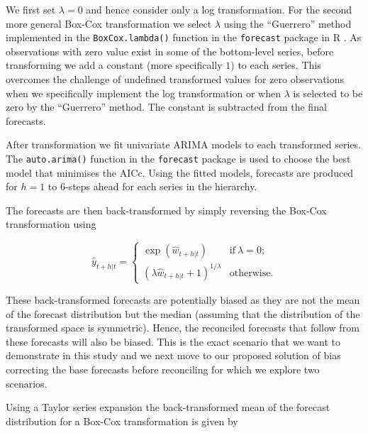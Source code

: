 \documentclass[12pt]{article}
\theoremstyle{definition}
\theoremstyle{property}
\begin{document}
We first set $\lambda=0$ and hence consider only a log transformation. For the second more general Box-Cox transformation we select $\lambda$ using the ``Guerrero'' method \citep{guerrero1993time} implemented in the \verb|BoxCox.lambda()| function in the \verb|forecast| package in R \citep{Rforecast}. As observations with zero value exist in some of the bottom-level series, before transforming we add a constant (more specifically $1$) to each series. This overcomes the challenge of undefined transformed values for zero observations when we specifically implement the log transformation or when $\lambda$ is selected to be zero by the ``Guerrero'' method. The constant is subtracted from the final forecasts.

After transformation we fit univariate ARIMA models to each transformed series. The \verb|auto.arima()| function in the \verb|forecast| package is used to choose the best model that minimises the AICc. Using the fitted models, forecasts are produced for $h=1$ to $6$-steps ahead for each series in the hierarchy.

The forecasts are then back-transformed by simply reversing the Box-Cox transformation using

\begin{equation} \label{eq:BoxCox_back-transformation}
	\hat{y}_{t+h|t} =
	\begin{cases}
	\exp({\hat{w}_{t+h|t}}) & \text{if}~\lambda = 0; \\
	(\lambda \hat{w}_{t+h|t} + 1)^{1/\lambda}  & \text{otherwise.}
	\end{cases}
\end{equation}

These back-transformed forecasts are potentially biased as they are not the mean of the forecast distribution but the median (assuming that the distribution of the transformed space is symmetric). Hence, the reconciled forecasts that follow from these forecasts will also be biased. This is the exact scenario that we want to demonstrate in this study and we next move to our proposed solution of bias correcting the base forecasts before reconciling for which we explore two scenarios.

Using a Taylor series expansion  the back-transformed mean of the forecast distribution for a Box-Cox transformation is given by
\end{document}
